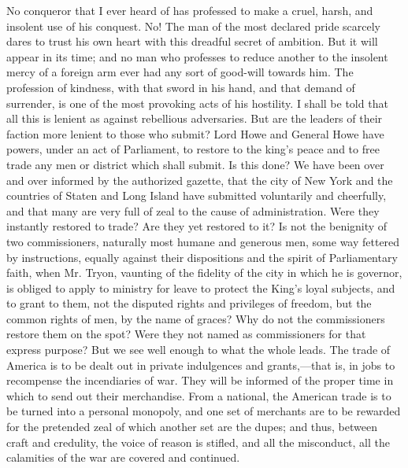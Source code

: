 No conqueror that I ever heard of has professed to make a cruel, harsh, and insolent use of his conquest. No! The man of the most declared pride scarcely dares to trust his own heart with this dreadful secret of ambition. But it will appear in its time; and no man who professes to reduce another to the insolent mercy of a foreign arm ever had any sort of good-will towards him. The profession of kindness, with that sword in his hand, and that demand of surrender, is one of the most provoking acts of his hostility. I shall be told that all this is lenient as against rebellious adversaries. But are the leaders of their faction more lenient to those who submit? Lord Howe and General Howe have powers, under an act of Parliament, to restore to the king's peace and to free trade any men or district which shall submit. Is this done? We have been over and over informed by the authorized gazette, that the city of New York and the countries of Staten and Long Island have submitted voluntarily and cheerfully, and that many are very full of zeal to the cause of administration. Were they instantly restored to trade? Are they yet restored to it? Is not the benignity of two commissioners, naturally most humane and generous men, some way fettered by instructions, equally against their dispositions and the spirit of Parliamentary faith, when Mr. Tryon, vaunting of the fidelity of the city in which he is governor, is obliged to apply to ministry for leave to protect the King's loyal subjects, and to grant to them, not the disputed rights and privileges of freedom, but the common rights of men, by the name of graces? Why do not the commissioners restore them on the spot? Were they not named as commissioners for that express purpose? But we see well enough to what the whole leads. The trade of America is to be dealt out in private indulgences and grants,—that is, in jobs to recompense the incendiaries of war. They will be informed of the proper time in which to send out their merchandise. From a national, the American trade is to be turned into a personal monopoly, and one set of merchants are to be rewarded for the pretended zeal of which another set are the dupes; and thus, between craft and credulity, the voice of reason is stifled, and all the misconduct, all the calamities of the war are covered and continued.

